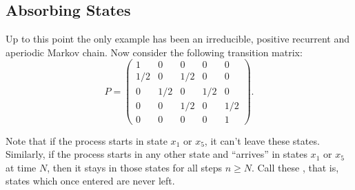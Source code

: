 \documentclass[12pt]{article}
\begin{document}

\subsection*{Absorbing States} Up to this point the only example has
been an irreducible, positive recurrent and aperiodic Markov chain.
Now consider the following transition matrix:
\[
    P =
    \begin{pmatrix}
        1 & 0 & 0 & 0 & 0 \\
        1/2 & 0 & 1/2 & 0 & 0 \\
        0 & 1/2 & 0 & 1/2 & 0 \\
        0 & 0& 1/2 & 0 & 1/2 \\
        0 & 0 & 0 & 0 & 1
    \end{pmatrix}
    .
\]

Note that if the process starts in state \( x_1 \) or \( x_5 \), it
can't leave these states.  Similarly, if the process starts in any other
state and ``arrives'' in states \( x_1 \) or \( x_5 \) at time \( N \),
then it stays in those states for all steps \( n\geq N \).  Call these
,%
that is, states which once entered are never left.
\end{document}
